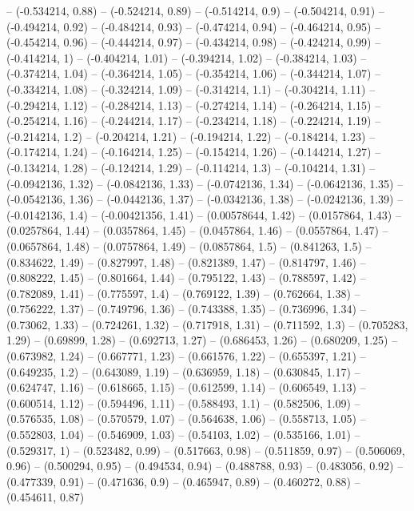 -- (-0.534214, 0.88)
-- (-0.524214, 0.89)
-- (-0.514214, 0.9)
-- (-0.504214, 0.91)
-- (-0.494214, 0.92)
-- (-0.484214, 0.93)
-- (-0.474214, 0.94)
-- (-0.464214, 0.95)
-- (-0.454214, 0.96)
-- (-0.444214, 0.97)
-- (-0.434214, 0.98)
-- (-0.424214, 0.99)
-- (-0.414214, 1)
-- (-0.404214, 1.01)
-- (-0.394214, 1.02)
-- (-0.384214, 1.03)
-- (-0.374214, 1.04)
-- (-0.364214, 1.05)
-- (-0.354214, 1.06)
-- (-0.344214, 1.07)
-- (-0.334214, 1.08)
-- (-0.324214, 1.09)
-- (-0.314214, 1.1)
-- (-0.304214, 1.11)
-- (-0.294214, 1.12)
-- (-0.284214, 1.13)
-- (-0.274214, 1.14)
-- (-0.264214, 1.15)
-- (-0.254214, 1.16)
-- (-0.244214, 1.17)
-- (-0.234214, 1.18)
-- (-0.224214, 1.19)
-- (-0.214214, 1.2)
-- (-0.204214, 1.21)
-- (-0.194214, 1.22)
-- (-0.184214, 1.23)
-- (-0.174214, 1.24)
-- (-0.164214, 1.25)
-- (-0.154214, 1.26)
-- (-0.144214, 1.27)
-- (-0.134214, 1.28)
-- (-0.124214, 1.29)
-- (-0.114214, 1.3)
-- (-0.104214, 1.31)
-- (-0.0942136, 1.32)
-- (-0.0842136, 1.33)
-- (-0.0742136, 1.34)
-- (-0.0642136, 1.35)
-- (-0.0542136, 1.36)
-- (-0.0442136, 1.37)
-- (-0.0342136, 1.38)
-- (-0.0242136, 1.39)
-- (-0.0142136, 1.4)
-- (-0.00421356, 1.41)
-- (0.00578644, 1.42)
-- (0.0157864, 1.43)
-- (0.0257864, 1.44)
-- (0.0357864, 1.45)
-- (0.0457864, 1.46)
-- (0.0557864, 1.47)
-- (0.0657864, 1.48)
-- (0.0757864, 1.49)
-- (0.0857864, 1.5)
-- (0.841263, 1.5)
-- (0.834622, 1.49)
-- (0.827997, 1.48)
-- (0.821389, 1.47)
-- (0.814797, 1.46)
-- (0.808222, 1.45)
-- (0.801664, 1.44)
-- (0.795122, 1.43)
-- (0.788597, 1.42)
-- (0.782089, 1.41)
-- (0.775597, 1.4)
-- (0.769122, 1.39)
-- (0.762664, 1.38)
-- (0.756222, 1.37)
-- (0.749796, 1.36)
-- (0.743388, 1.35)
-- (0.736996, 1.34)
-- (0.73062, 1.33)
-- (0.724261, 1.32)
-- (0.717918, 1.31)
-- (0.711592, 1.3)
-- (0.705283, 1.29)
-- (0.69899, 1.28)
-- (0.692713, 1.27)
-- (0.686453, 1.26)
-- (0.680209, 1.25)
-- (0.673982, 1.24)
-- (0.667771, 1.23)
-- (0.661576, 1.22)
-- (0.655397, 1.21)
-- (0.649235, 1.2)
-- (0.643089, 1.19)
-- (0.636959, 1.18)
-- (0.630845, 1.17)
-- (0.624747, 1.16)
-- (0.618665, 1.15)
-- (0.612599, 1.14)
-- (0.606549, 1.13)
-- (0.600514, 1.12)
-- (0.594496, 1.11)
-- (0.588493, 1.1)
-- (0.582506, 1.09)
-- (0.576535, 1.08)
-- (0.570579, 1.07)
-- (0.564638, 1.06)
-- (0.558713, 1.05)
-- (0.552803, 1.04)
-- (0.546909, 1.03)
-- (0.54103, 1.02)
-- (0.535166, 1.01)
-- (0.529317, 1)
-- (0.523482, 0.99)
-- (0.517663, 0.98)
-- (0.511859, 0.97)
-- (0.506069, 0.96)
-- (0.500294, 0.95)
-- (0.494534, 0.94)
-- (0.488788, 0.93)
-- (0.483056, 0.92)
-- (0.477339, 0.91)
-- (0.471636, 0.9)
-- (0.465947, 0.89)
-- (0.460272, 0.88)
-- (0.454611, 0.87)

